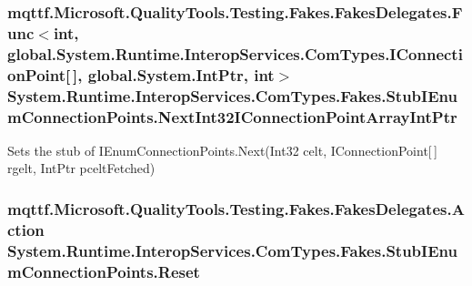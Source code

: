\hypertarget{class_system_1_1_runtime_1_1_interop_services_1_1_com_types_1_1_fakes_1_1_stub_i_enum_connection_points_ae390d64962030eea54830f6ba8b7b97e}{
\subsubsection[{Next\-Int32\-I\-Connection\-Point\-Array\-Int\-Ptr}]{\setlength{\rightskip}{0pt plus 5cm}mqttf.\-Microsoft.\-Quality\-Tools.\-Testing.\-Fakes.\-Fakes\-Delegates.\-Func$<$int, global.\-System.\-Runtime.\-Interop\-Services.\-Com\-Types.\-I\-Connection\-Point\mbox{[}$\,$\mbox{]}, global.\-System.\-Int\-Ptr, int$>$ System.\-Runtime.\-Interop\-Services.\-Com\-Types.\-Fakes.\-Stub\-I\-Enum\-Connection\-Points.\-Next\-Int32\-I\-Connection\-Point\-Array\-Int\-Ptr}}\label{class_system_1_1_runtime_1_1_interop_services_1_1_com_types_1_1_fakes_1_1_stub_i_enum_connection_points_ae390d64962030eea54830f6ba8b7b97e}


Sets the stub of I\-Enum\-Connection\-Points.\-Next(\-Int32 celt, I\-Connection\-Point\mbox{[}$\,$\mbox{]} rgelt, Int\-Ptr pcelt\-Fetched)

\hypertarget{class_system_1_1_runtime_1_1_interop_services_1_1_com_types_1_1_fakes_1_1_stub_i_enum_connection_points_a7ab3ffd213910588ffa854df4963fb5f}{
\subsubsection[{Reset}]{\setlength{\rightskip}{0pt plus 5cm}mqttf.\-Microsoft.\-Quality\-Tools.\-Testing.\-Fakes.\-Fakes\-Delegates.\-Action System.\-Runtime.\-Interop\-Services.\-Com\-Types.\-Fakes.\-Stub\-I\-Enum\-Connection\-Points.\-Reset}}\label{class_system_1_1_runtime_1_1_interop_services_1_1_com_types_1_1_fakes_1_1_stub_i_enum_connection_points_a7ab3ffd213910588ffa854df4963fb5f}


